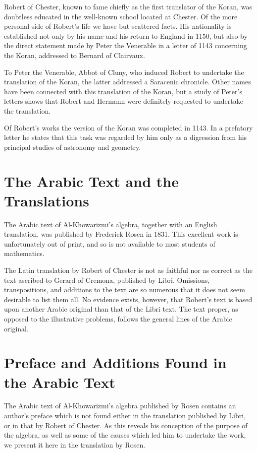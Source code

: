 \documentclass[11pt,a4paper,twoside]{book}
\begin{document}
Robert of Chester, known to fame chiefly as the first translator of the Koran, was doubtless educated in the well-known school located at Chester. Of the more personal side of Robert's life we have but scattered facts. His nationality is established not only by his name and his return to England in 1150, but also by the direct statement made by Peter the Venerable in a letter of 1143 concerning the Koran, addressed to Bernard of Clairvaux.

To Peter the Venerable, Abbot of Cluny, who induced Robert to undertake the translation of the Koran, the latter addressed a Saracenic chronicle. Other names have been connected with this translation of the Koran, but a study of Peter's letters shows that Robert and Hermann were definitely requested to undertake the translation.

Of Robert's works the version of the Koran was completed in 1143. In a prefatory letter he states that this task was regarded by him only as a digression from his principal studies of astronomy and geometry.

\chapter{The Arabic Text and the Translations}

The Arabic text of Al-Khowarizmi's algebra, together with an English translation, was published by Frederick Rosen in 1831. This excellent work is unfortunately out of print, and so is not available to most students of mathematics.

The Latin translation by Robert of Chester is not as faithful nor as correct as the text ascribed to Gerard of Cremona, published by Libri. Omissions, transpositions, and additions to the text are so numerous that it does not seem desirable to list them all. No evidence exists, however, that Robert's text is based upon another Arabic original than that of the Libri text. The text proper, as opposed to the illustrative problems, follows the general lines of the Arabic original.

\chapter{Preface and Additions Found in the Arabic Text}

The Arabic text of Al-Khowarizmi's algebra published by Rosen contains an author's preface which is not found either in the translation published by Libri, or in that by Robert of Chester. As this reveals his conception of the purpose of the algebra, as well as some of the causes which led him to undertake the work, we present it here in the translation by Rosen.
\end{document}
